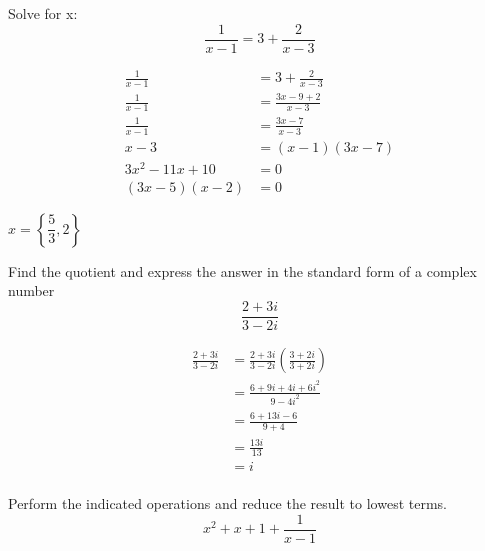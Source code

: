 \documentclass[fleqn,addpoints]{exam}
\begin{document}
\begin{questions}

\question
Solve for x:
\[
\frac{1}{x-1} = 3 + \frac{2}{x-3}
\]

\begin{solution}[1cm]
\begin{align*}
  \frac{1}{x-1} &= 3 + \frac{2}{x-3} \\
  \frac{1}{x-1} &= \frac{3x-9+2}{x-3} \\
  \frac{1}{x-1} &= \frac{3x-7}{x-3} \\
  x-3 &= (x-1)(3x-7) \\
  3x^2 - 11x + 10 &= 0 \\
  (3x-5)(x-2) &= 0
\end{align*}

$x = \left\{\dfrac{5}{3}, 2 \right\}$

\end{solution}

\question
Find the quotient and express the answer in the standard form of a complex number
\[
\frac{2+3i}{3-2i}
\]

\begin{solution}[1cm]
\begin{align*}
  \frac{2+3i}{3-2i} &= \frac{2+3i}{3-2i} \left( \frac{3+2i}{3+2i} \right) \\
  &= \frac{6 + 9i + 4i + 6i^2}{9-4i^2} \\
  &= \frac{6 + 13i -6}{9+4} \\
  &= \frac{13i}{13} \\
  &= i \\
\end{align*}

\end{solution}

\ifprintanswers
\pagebreak
\fi


\question
Perform the indicated operations and reduce the result to lowest terms.
\[
x^2 + x + 1 + \frac{1}{x-1}
\]


\end{questions}
\end{document}
